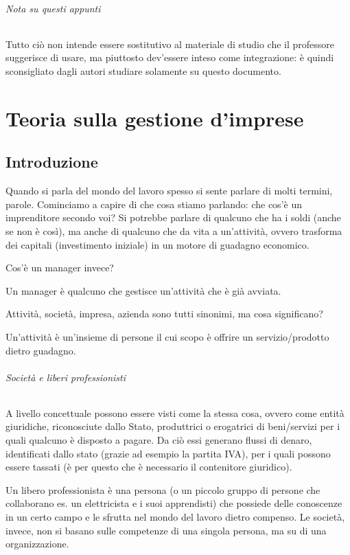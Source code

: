 \paragraph*{Nota su questi appunti} Tutto ciò non intende essere sostitutivo al 
materiale di studio che il professore suggerisce di usare, ma piuttosto 
dev'essere inteso come integrazione: è quindi sconsigliato dagli autori studiare 
solamente su questo documento.

\part{Teoria sulla gestione d'imprese}

\chapter{Introduzione}

Quando si parla del mondo del lavoro spesso si sente parlare di molti termini,
parole. Cominciamo a capire di che cosa stiamo parlando: che cos'è un
imprenditore secondo voi? Si potrebbe parlare di qualcuno che ha i soldi (anche
se non è così), ma anche di qualcuno che da vita a un'attività, ovvero
trasforma dei capitali (investimento iniziale) in un motore di guadagno
economico.

Cos'è un manager invece?
\begin{definition}[Manager]
Un manager è qualcuno che gestisce un'attività che è già avviata.
\end{definition}

Attività, società, impresa, azienda sono tutti sinonimi, ma cosa significano?
\begin{definition}[Attività]
Un'attività è un'insieme di persone il cui scopo è offrire un servizio/prodotto
dietro guadagno.
\end{definition}

\paragraph*{Società e liberi professionisti} A livello concettuale possono
essere visti come la stessa cosa, ovvero come entità giuridiche, riconosciute
dallo Stato, produttrici o erogatrici di beni/servizi per i quali qualcuno è
disposto a pagare. Da ciò essi generano flussi di denaro, identificati dallo
stato (grazie ad esempio la partita IVA), per i quali possono essere tassati (è
per questo che è necessario il contenitore giuridico).

\begin{definition}
Un libero professionista è una persona (o un piccolo gruppo di
persone che collaborano es. un elettricista e i suoi apprendisti) che possiede
delle conoscenze in un certo campo e le sfrutta nel mondo del lavoro dietro
compenso. Le società, invece, non si basano sulle competenze di una singola
persona, ma su di una organizzazione.
\end{definition}

